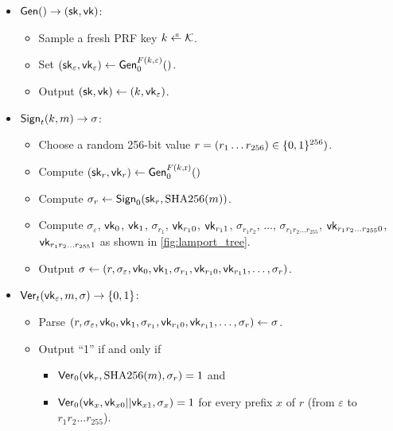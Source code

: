 \begin{framed}
\begin{itemize}
  \item $\mathsf{Gen}() \to ({\mathsf{sk}}, \mathsf{vk})$:
    \begin{itemize}
      \item Sample a fresh PRF key $k \getsr \calK$.
      \item Set $({\mathsf{sk}}_\varepsilon, \mathsf{vk}_\varepsilon) \gets \mathsf{Gen}_0^{F(k, \varepsilon)}()$.
      \item Output $({\mathsf{sk}}, \mathsf{vk}) \gets (k, \mathsf{vk}_\varepsilon)$.
    \end{itemize}

  \item $\mathsf{Sign}_t(k, m) \to \sigma$: 
    \begin{itemize}
      \item Choose a random 256-bit value $r = (r_1 \dots r_{256}) \in \{0,1\}^{256})$.
      \item Compute $({\mathsf{sk}}_r, \mathsf{vk}_r) \gets \mathsf{Gen}_0^{F(k, \text{r})}()$
      \item Compute $\sigma_r \gets \mathsf{Sign}_0({\mathsf{sk}}_r, \text{SHA256}(m))$.
      \item Compute $\sigma_\varepsilon$, $\mathsf{vk}_0$, $\mathsf{vk}_1$,
                    $\sigma_{r_1}$, $\mathsf{vk}_{r_1 0}$, $\mathsf{vk}_{r_1 1}$,
                    $\sigma_{r_1 r_2}$, $\ldots$,
                    $\sigma_{r_1 r_2 \ldots r_{255}}$,
                    $\mathsf{vk}_{r_1 r_2 \ldots r_{255} 0}$,
                    $\mathsf{vk}_{r_1 r_2 \ldots r_{255} 1}$
            as shown in \cref{fig:lamport_tree}.
      \item Output $\sigma \gets (r, \sigma_\varepsilon, \mathsf{vk}_0, \mathsf{vk}_1, \sigma_{r_1}, \mathsf{vk}_{r_1 0}, \mathsf{vk}_{r_1 1}, \ldots, \sigma_r)$.
    \end{itemize}
  \item $\mathsf{Ver}_t(\mathsf{vk}_\varepsilon, m, \sigma) \to \{0,1\}$:
    \begin{itemize}
      \item Parse $(r, \sigma_\varepsilon, \mathsf{vk}_0, \mathsf{vk}_1, \sigma_{r_1}, \mathsf{vk}_{r_1 0}, \mathsf{vk}_{r_1 1}, \ldots, \sigma_r) \gets \sigma$.
      \item Output ``1'' if and only if 
        \begin{itemize}
          \item $\mathsf{Ver}_0(\mathsf{vk}_r, \text{SHA256}(m), \sigma_r) = 1$
        and 
      \item $\mathsf{Ver}_0(\mathsf{vk}_x, \mathsf{vk}_{x0} || \mathsf{vk}_{x1}, \sigma_x) = 1$ for every
        prefix $x$ of $r$ (from $\varepsilon$ to $r_1 r_2 \ldots r_{255}$).
        \end{itemize}
    \end{itemize}
\end{itemize}
\end{framed}

